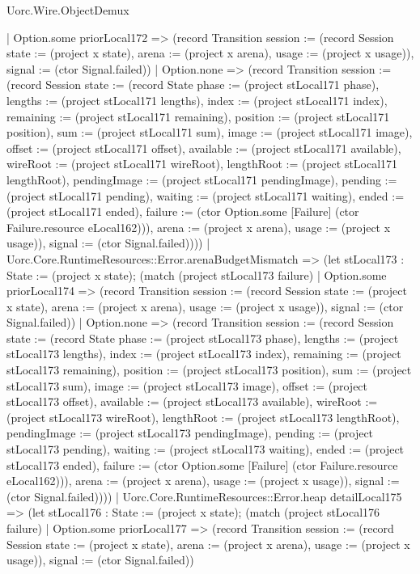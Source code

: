 \begin{lexlean}{Uorc.Wire.ObjectDemux}
\begin{semanticmodule}
{        | Option.some priorLocal172 => (record Transition {session := (record Session {state := (project x state), arena := (project x arena), usage := (project x usage)}), signal := (ctor Signal.failed)})
        | Option.none => (record Transition {session := (record Session {state := (record State {phase := (project stLocal171 phase), lengths := (project stLocal171 lengths), index := (project stLocal171 index), remaining := (project stLocal171 remaining), position := (project stLocal171 position), sum := (project stLocal171 sum), image := (project stLocal171 image), offset := (project stLocal171 offset), available := (project stLocal171 available), wireRoot := (project stLocal171 wireRoot), lengthRoot := (project stLocal171 lengthRoot), pendingImage := (project stLocal171 pendingImage), pending := (project stLocal171 pending), waiting := (project stLocal171 waiting), ended := (project stLocal171 ended), failure := (ctor Option.some [Failure] (ctor Failure.resource eLocal162))}), arena := (project x arena), usage := (project x usage)}), signal := (ctor Signal.failed)})))
      | Uorc.Core.RuntimeResources::Error.arenaBudgetMismatch => (let stLocal173 : State := (project x state); (match (project stLocal173 failure)
        | Option.some priorLocal174 => (record Transition {session := (record Session {state := (project x state), arena := (project x arena), usage := (project x usage)}), signal := (ctor Signal.failed)})
        | Option.none => (record Transition {session := (record Session {state := (record State {phase := (project stLocal173 phase), lengths := (project stLocal173 lengths), index := (project stLocal173 index), remaining := (project stLocal173 remaining), position := (project stLocal173 position), sum := (project stLocal173 sum), image := (project stLocal173 image), offset := (project stLocal173 offset), available := (project stLocal173 available), wireRoot := (project stLocal173 wireRoot), lengthRoot := (project stLocal173 lengthRoot), pendingImage := (project stLocal173 pendingImage), pending := (project stLocal173 pending), waiting := (project stLocal173 waiting), ended := (project stLocal173 ended), failure := (ctor Option.some [Failure] (ctor Failure.resource eLocal162))}), arena := (project x arena), usage := (project x usage)}), signal := (ctor Signal.failed)})))
      | Uorc.Core.RuntimeResources::Error.heap detailLocal175 => (let stLocal176 : State := (project x state); (match (project stLocal176 failure)
        | Option.some priorLocal177 => (record Transition {session := (record Session {state := (project x state), arena := (project x arena), usage := (project x usage)}), signal := (ctor Signal.failed)})
}
\end{semanticmodule}
\end{lexlean}
